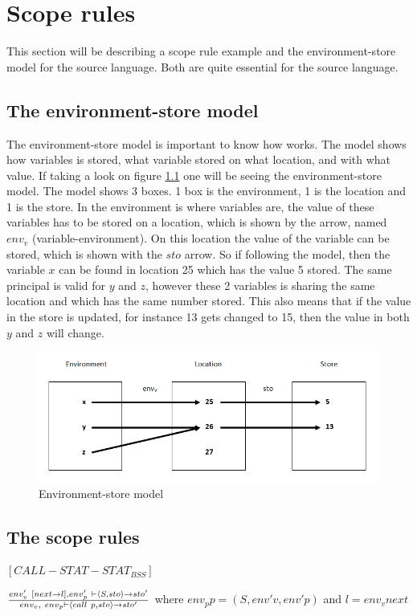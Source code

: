 \chapter{Scope rules}\label{chap:scope-rules}
This section will be describing a scope rule example and the environment-store model for the source language. Both are quite essential for the source language. 

\section{The environment-store model}\label{sec:es-model}
The environment-store model is important to know how works. The model shows how variables is stored, what variable stored on what location, and with what value. If taking a look on figure \ref{fig:esmodel} one will be seeing the environment-store model. The model shows 3 boxes. 1 box is the environment, 1 is the location and 1 is the store. In the environment is where variables are, the value of these variables has to be stored on a location, which is shown by the arrow, named $env_v$ (variable-environment). On this location the value of the variable can be stored, which is shown with the $sto$ arrow. So if following the model, then the variable $x$ can be found in location 25  which has the value 5 stored. The same principal is valid for $y$ and $z$, however these 2 variables is sharing the same location and which has the same number stored. This also means that if the value in the store is updated, for instance 13 gets changed to 15, then the value in both $y$ and $z$ will change. 
\begin{figure}[H]
\includegraphics{billeder/environment_store_model.png}
\caption{Environment-store model}
\label{fig:esmodel}
\end{figure}


\section{The scope rules}\label{sec:scope-rules}



$[CALL-STAT-STAT_{BSS}]$

$env'_{v}~[next \rightarrow l], env'_{p}~ \vdash \langle S,sto \rangle \rightarrow sto' \over env_{v}, ~ env_{p} \vdash \langle call~p, sto \rangle \rightarrow sto'$ 
where $env_{p}p = (S,env'{v},env'{p})$
and $l = env_{v}next$




